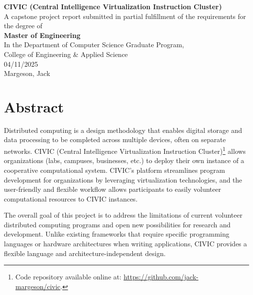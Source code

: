 \documentclass[11pt]{article}
\begin{document}
\thispagestyle{empty}
\begin{titlepage}
    \begin{center}
        
        \vspace*{25mm}
        \textbf{\LARGE CIVIC (Central Intelligence Virtualization Instruction Cluster)} 
        \\ \vspace*{20mm}
        A capstone project report submitted in partial fulfillment of the requirements for the degree of 
        \\ \vspace*{20mm}
        \textbf{\LARGE Master of Engineering}
        \\ \vspace*{20mm}
        In the Department of Computer Science Graduate Program, 
        \\
        College of Engineering \& Applied Science
        \\ \vspace*{20mm}
        04/11/2025 
        \\ \vspace*{20mm}
        Margeson, Jack
    \end{center}
\end{titlepage}

\setcounter{page}{2}
\section{Abstract}

Distributed computing is a design methodology that enables digital storage and data processing to be completed across multiple devices, often on separate networks. CIVIC (Central Intelligence Virtualization Instruction Cluster)\footnote{Code repository available online at: \url{https://github.com/jack-margeson/civic}.} allows organizations (labs, campuses, businesses, etc.) to deploy their own instance of a cooperative computational system. CIVIC’s platform streamlines program development for organizations by leveraging virtualization technologies, and the user-friendly and flexible workflow allows participants to easily volunteer computational resources to CIVIC instances.

The overall goal of this project is to address the limitations of current volunteer distributed computing programs and open new possibilities for research and development. Unlike existing frameworks that require specific programming languages or hardware architectures when writing applications, CIVIC provides a flexible language and architecture-independent design.
\end{document}
